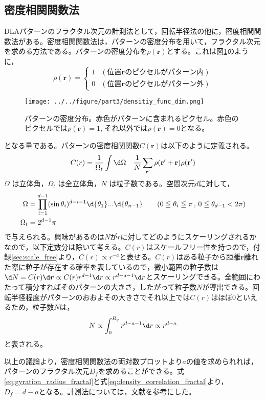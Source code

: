 \documentclass[autodetect-engine,dvi=dvipdfmx,a4paper,ja=standard,oneside,openany,11pt]{bxjsbook}
\begin{document}
\subsection{密度相関関数法}
\label{sec:density_correlation}
DLAパターンのフラクタル次元の計測法として，回転半径法の他に，密度相関関数法がある。密度相関関数法は，パターンの密度分布を用いて，フラクタル次元を求める方法である。パターンの密度分布を$\rho(\bm{r})$とする。これは図\ref{fig:density_func_dif}のように，
\begin{equation}
  \rho(\bm{r})=
  \begin{cases}
    1 & (\mathrm{位置\bm{r}のピクセルがパターン内}) \\
    0 & (\mathrm{位置\bm{r}のピクセルがパターン外})
  \end{cases}
  \label{eq:density_distribution}
\end{equation}
\begin{figure}[htbp]
  \centering
  \texttt{[image: ../../figure/part3/densitiy\_func\_dim.png]}
  \caption{パターンの密度分布。赤色がパターンに含まれるピクセル。赤色のピクセルでは$\rho(\bm{r})=1$, それ以外では$\rho(\bm{r})=0$となる。}
  \label{fig:density_func_dif}
\end{figure}
となる量である。パターンの密度相関関数$C(\bm{r})$は以下のように定義される。
\begin{equation}
  C(r)=\frac{1}{\Omega_t}\int \d\Omega \quad \frac{1}{N}\sum_{{\bf{r'}}}\rho({\bf r'+ r})\rho({\bf {r'}})
  \label{eq:density_correlation}
\end{equation}
$\Omega$ は立体角，$\Omega_t$ は全立体角，$N$ は粒子数である。空間次元$d$に対して，
\begin{equation}
  \begin{aligned}
    \Omega   & =\prod^{d-1}_{i=1} (\sin\theta_i)^{d-i-1} \d{\theta_1}...\d{\theta_{n-1}} \qquad(0\leqq \theta_i\leqq \pi\,,\,0\leqq\theta_{d-1}<2\pi) \\
    \Omega_t & =2^{d-1}\pi
  \end{aligned}
  \label{eq:omega}
\end{equation}
で与えられる。興味があるのは$N$が$r$に対してどのようにスケーリングされるかなので，以下定数分は除いて考える。$C(r)$はスケールフリー性を持つので，付録\ref{sec:scale_free}より，$C(r)\propto r^{-a}$と表せる。$C(r)$はある粒子から距離$\bm{r}$離れた際に粒子が存在する確率を表しているので，微小範囲の粒子数は$\d N=C(r)\d \bm{r}\propto C(r)r^{d-1}\d r\propto r^{d-a-1} \d r $とスケーリングできる。全範囲にわたって積分すればそのパターンの大きさ，したがって粒子数$N$が導出できる。回転半径程度がパターンのおおよその大きさでそれ以上では$C(r)$はほぼ0といえるため，粒子数$N$は，
\begin{equation}
  N\propto \int_{0}^{R_g} r^{d-a-1} \d r\propto r^{d-a}
  \label{eq:density_correlation_fractal}
\end{equation}
と表される。

以上の議論より，密度相関関数法の両対数プロットより$a$の値を求められれば，パターンのフラクタル次元$D_f$を求めることができる。式\ref{eq:gyration_radius_fractal}と式\ref{eq:density_correlation_fractal}より，$D_f=d-a$となる。計測法については，文献\cite{フラクタルの物理Ⅰ}を参考にした。
\ifdraft{
  
  
}{}
\end{document}
